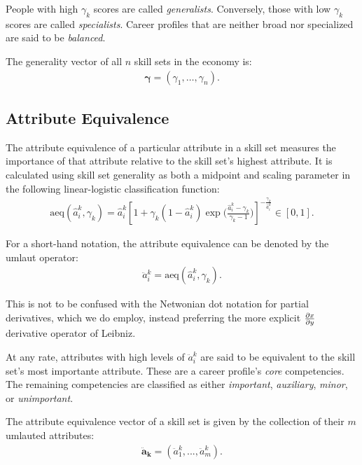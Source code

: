 \documentclass{elsarticle} %
\begin{document}
People with high $\gamma_{k}$ scores are called \textit{generalists}.
Conversely, those with low $\gamma_{k}$ scores are called \textit{specialists}.
Career profiles that are neither broad nor specialized are said to be
\textit{balanced}.

The generality vector of all $n$ skill sets in the economy is:
\begin{gather}
    \boldsymbol{\gamma} = (\gamma_{1}, \dots, \gamma_{n})
    .
\end{gather}

\subsection{Attribute Equivalence}
The attribute equivalence of a particular attribute in a skill set measures the
importance of that attribute relative to the skill set's highest attribute. It
is calculated using skill set generality as both a midpoint and scaling
parameter in the following linear-logistic classification function:
\begin{gather}
    \text{aeq}(\hat{a}_{i}^{k}, \gamma_{k}) =
    \hat{a}_{i}^{k}
    \left[
        1 + \gamma_{k} (1 - \hat{a}_{i}^{k})
        \exp\bigg(
        \frac{\hat{a}_{i}^{k} - \gamma_{k}}{\gamma_{k} - 1}
        \bigg)
        \right] ^ {
    -\frac{\gamma_{k}}{\hat{a}_{i}^{k}}
    }
    \in [0,1]
    .
\end{gather}

For a short-hand notation, the attribute equivalence can be denoted by the
umlaut operator:
\begin{gather}
    \ddot{a}_{i}^{k} = \text{aeq}(\hat{a}_{i}^{k}, \gamma_{k})
    .
\end{gather}

This is not to be confused with the Netwonian dot notation for partial
derivatives, which we do employ, instead preferring the more explicit
$\partialderivative{x}{y}$ derivative operator of Leibniz.

At any rate, attributes with high levels of $\ddot{a}_{i}^{k}$ are said to be
equivalent to the skill set's most importante attribute. These are a career
profile's \textit{core} competencies. The remaining competencies are classified
as either \textit{important}, \textit{auxiliary}, \textit{minor}, or
\textit{unimportant}.

The attribute equivalence vector of a skill set is given by the collection of
their $m$ umlauted attributes:
\begin{gather}
    \boldsymbol{\ddot{a}_{k}} = (\ddot{a}_{1}^{k}, ..., \ddot{a}_{m}^{k})
    .
\end{gather}
\end{document}
